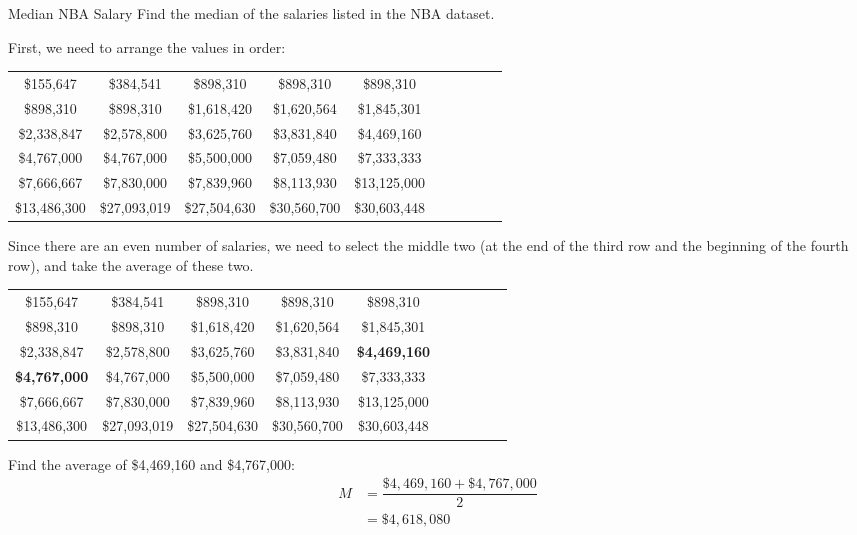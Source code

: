 \begin{example}[https://www.youtube.com/watch?v=jVQSDpFmMOg&list=PLfmpjsIzhzttL_Uec2nCbDRcAcUF7NKG8&index=14]{Median NBA Salary}
Find the median of the salaries listed in the NBA dataset.

\sol
First, we need to arrange the values in order:
\begin{center}
\begin{tabular}{c c c c c c c c c c}
\$155,647 & 
\$384,541 & 
\$898,310 & 
\$898,310 & 
\$898,310\\
\$898,310 & 
\$898,310 & 
\$1,618,420 & 
\$1,620,564 & 
\$1,845,301\\ 
\$2,338,847 & 
\$2,578,800 & 
\$3,625,760 & 
\$3,831,840 & 
\$4,469,160\\
\$4,767,000 & 
\$4,767,000 & 
\$5,500,000 & 
\$7,059,480 & 
\$7,333,333\\
\$7,666,667 & 
\$7,830,000 & 
\$7,839,960 & 
\$8,113,930 & 
\$13,125,000\\
\$13,486,300 & 
\$27,093,019 & 
\$27,504,630 & 
\$30,560,700 & 
\$30,603,448
\end{tabular}
\end{center}

Since there are an even number of salaries, we need to select the middle two (at the end of the third row and the beginning of the fourth row), and take the average of these two.
\begin{center}
\begin{tabular}{c c c c c c c c c c}
\$155,647 & 
\$384,541 & 
\$898,310 & 
\$898,310 & 
\$898,310\\
\$898,310 & 
\$898,310 & 
\$1,618,420 & 
\$1,620,564 & 
\$1,845,301\\ 
\$2,338,847 & 
\$2,578,800 & 
\$3,625,760 & 
\$3,831,840 & 
{\Large\bfseries\color{red} \$4,469,160}\\
{\Large\bfseries\color{red} \$4,767,000} & 
\$4,767,000 & 
\$5,500,000 & 
\$7,059,480 & 
\$7,333,333\\
\$7,666,667 & 
\$7,830,000 & 
\$7,839,960 & 
\$8,113,930 & 
\$13,125,000\\
\$13,486,300 & 
\$27,093,019 & 
\$27,504,630 & 
\$30,560,700 & 
\$30,603,448
\end{tabular}
\end{center}

Find the average of \$4,469,160 and \$4,767,000:
\begin{align*}
M &= \dfrac{\$4,469,160 + \$4,767,000}{2}\\
&= \boxed{\$4,618,080}
\end{align*}
\end{example}

